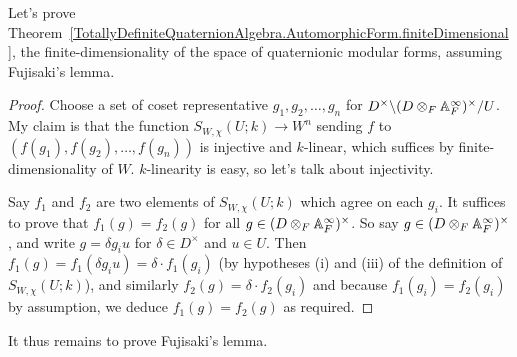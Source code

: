Let's prove Theorem~\ref{TotallyDefiniteQuaternionAlgebra.AutomorphicForm.finiteDimensional},
the finite-dimensionality of the space of quaternionic modular forms,
assuming Fujisaki's lemma.
\begin{proof}
  Choose a set of coset representative $g_1,g_2,\ldots,g_n$ for
  $D^\times\backslash(D\otimes_F\mathbb{A}_F^\infty)^\times/U$. My claim is that
  the function $S_{W,\chi}(U;k)\to W^n$ sending $f$ to $(f(g_1),f(g_2),\ldots,f(g_n))$
  is injective and $k$-linear, which suffices by finite-dimensionality of $W$.
  $k$-linearity is easy, so let's talk about injectivity.

  Say $f_1$ and $f_2$ are two elements of $S_{W,\chi}(U;k)$ which agree on
  each $g_i$. It suffices to prove that $f_1(g)=f_2(g)$ for all
  $g\in(D\otimes_F\mathbb{A}_F^\infty)^\times$. So say $g\in(D\otimes_F\mathbb{A}_F^\infty)^\times$,
  and write $g=\delta g_iu$ for $\delta \in D^\times$ and $u\in U$.
  Then $f_1(g)=f_1(\delta g_iu)=\delta\cdot f_1(g_i)$ (by hypotheses (i) and (iii)
  of the definition of $S_{W,\chi}(U;k)$), and similarly $f_2(g)=\delta\cdot f_2(g_i)$
  and because $f_1(g_i)=f_2(g_i)$ by assumption, we deduce $f_1(g)=f_2(g)$ as required.
\end{proof}

It thus remains to prove Fujisaki's lemma.


